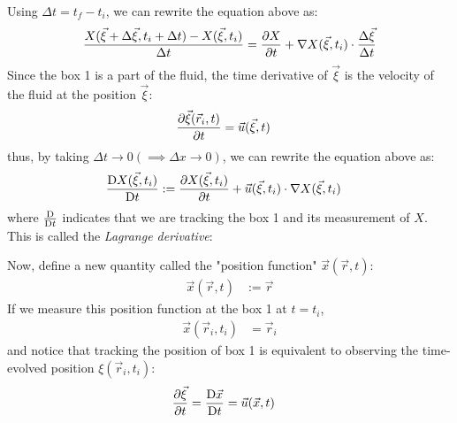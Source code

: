 Using $\Delta t = t_f - t_i$, we can rewrite the equation above as:
\begin{align}
  \frac{X(\vec{\xi} + \Delta \vec{\xi}, t_i + \Delta t) - X(\vec{\xi}, t_i)}{\Delta t}
   & = \pdv{X}{t} + \nabla X(\vec{\xi}, t_i) \cdot \frac{\Delta \vec{\xi}}{\Delta t} \\
\end{align}
Since the box 1 is a part of the fluid, the time derivative of $\vec{\xi}$ is the velocity of the fluid at the position $\vec{\xi}$:
\begin{align}
  \pdv{\vec{\xi}(\vec{r}_i, t)}{t} & = \vec{u}(\vec{\xi}, t)
\end{align}
thus, by taking $\Delta t \to 0 (\implies \Delta x \to 0)$, we can rewrite the equation above as:
\begin{align}
  \mdv{X(\vec{\xi}, t_i)}{t} & := \pdv{X(\vec{\xi}, t_i)}{t} + \vec{u}(\vec{\xi}, t_i) \cdot  \nabla X(\vec{\xi}, t_i)
\end{align}
where $\mdv{}{t}$ indicates that we are tracking the box 1 and its measurement of $X$.
This is called the \emph{Lagrange derivative}:

Now, define a new quantity called the "position function" $\vec{x}(\vec{r}, t)$:
\begin{align}
  \vec{x}(\vec{r}, t) & := \vec{r}
\end{align}
If we measure this position function at the box 1 at $t = t_i$,
\begin{align}
  \vec{x}(\vec{r}_i, t_i) & = \vec{r}_i
\end{align}
and notice that tracking the position of box 1 is equivalent to observing the time-evolved position $\xi(\vec{r}_i, t_i)$:
\begin{align}
  \pdv{\vec{\xi}}{t} & = \mdv{\vec{x}}{t} = \vec{u}(\vec{x}, t)
\end{align}

